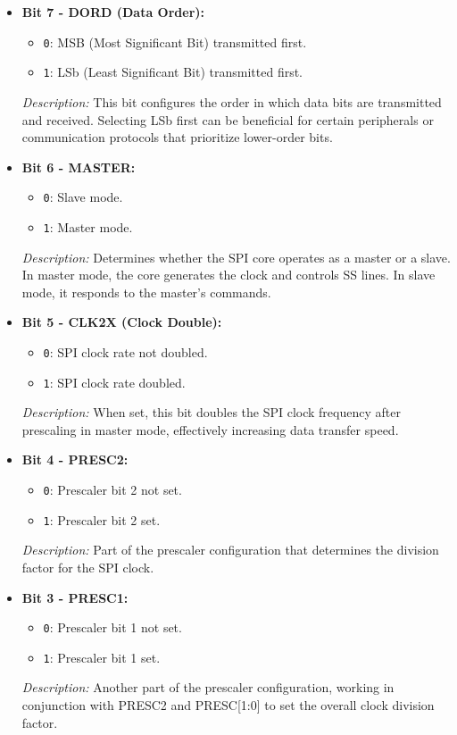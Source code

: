 \documentclass{article}
\begin{document}
\begin{itemize}
    \item \textbf{Bit 7 - DORD (Data Order):} 
    \begin{itemize}
        \item \texttt{0}: MSB (Most Significant Bit) transmitted first.
        \item \texttt{1}: LSb (Least Significant Bit) transmitted first.
    \end{itemize}
    \textit{Description:} This bit configures the order in which data bits are transmitted and received. Selecting LSb first can be beneficial for certain peripherals or communication protocols that prioritize lower-order bits.
    
    \item \textbf{Bit 6 - MASTER:} 
    \begin{itemize}
        \item \texttt{0}: Slave mode.
        \item \texttt{1}: Master mode.
    \end{itemize}
    \textit{Description:} Determines whether the SPI core operates as a master or a slave. In master mode, the core generates the clock and controls SS lines. In slave mode, it responds to the master's commands.
    
    \item \textbf{Bit 5 - CLK2X (Clock Double):} 
    \begin{itemize}
        \item \texttt{0}: SPI clock rate not doubled.
        \item \texttt{1}: SPI clock rate doubled.
    \end{itemize}
    \textit{Description:} When set, this bit doubles the SPI clock frequency after prescaling in master mode, effectively increasing data transfer speed.
    
    \item \textbf{Bit 4 - PRESC2:} 
    \begin{itemize}
        \item \texttt{0}: Prescaler bit 2 not set.
        \item \texttt{1}: Prescaler bit 2 set.
    \end{itemize}
    \textit{Description:} Part of the prescaler configuration that determines the division factor for the SPI clock.
    
    \item \textbf{Bit 3 - PRESC1:} 
    \begin{itemize}
        \item \texttt{0}: Prescaler bit 1 not set.
        \item \texttt{1}: Prescaler bit 1 set.
    \end{itemize}
    \textit{Description:} Another part of the prescaler configuration, working in conjunction with PRESC2 and PRESC[1:0] to set the overall clock division factor.
    

\end{itemize}
\end{document}
